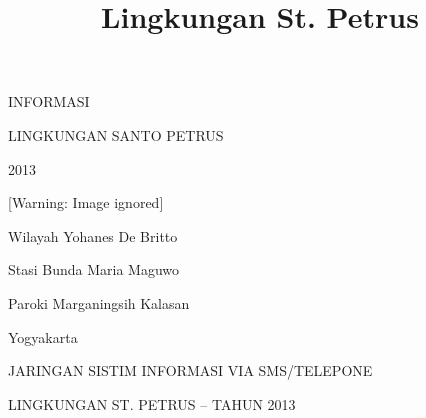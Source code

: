 \documentclass{article}
\title{Lingkungan St. Petrus}
\begin{document}
INFORMASI

\begin{figure}

\end{figure}
\begin{figure}

\end{figure}
LINGKUNGAN SANTO PETRUS

2013\ \ 

   [Warning: Image ignored] %
 

Wilayah Yohanes De Britto

Stasi Bunda Maria Maguwo

Paroki Marganingsih Kalasan

Yogyakarta

JARINGAN SISTIM INFORMASI VIA SMS/TELEPONE

LINGKUNGAN ST. PETRUS -- TAHUN 2013
\end{document}
